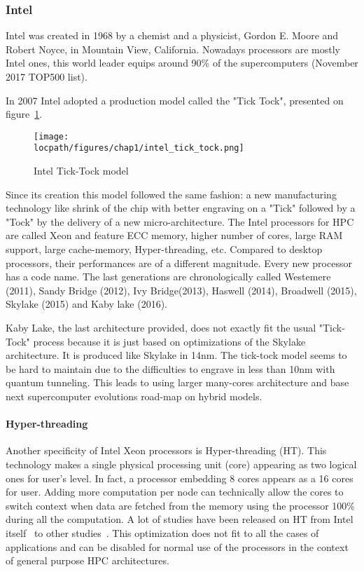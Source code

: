 \subsubsection{Intel}
Intel was created in 1968 by a chemist and a physicist, Gordon E. Moore and Robert Noyce, in Mountain View, California. 
Nowadays processors are mostly Intel ones, this world leader equips around 90\% of the supercomputers (November 2017 TOP500 list).

In 2007 Intel adopted a production model called the "Tick Tock", presented on figure~\ref{fig:1_HPC:intel_tick_tock}.
\begin{figure}[t!]
\begin{center}
\texttt{[image: \\locpath/figures/chap1/intel\_tick\_tock.png]}
\caption{Intel Tick-Tock model}
\label{fig:1_HPC:intel_tick_tock}
\end{center}
\end{figure}
Since its creation this model followed the same fashion: a new manufacturing technology like shrink of the chip with better engraving on a "Tick" followed by a "Tock" by the delivery of a new micro-architecture.
The Intel processors for HPC are called Xeon and feature ECC memory, higher number of cores, large RAM support, large cache-memory, Hyper-threading, etc. 
Compared to desktop processors, their performances are of a different magnitude.
Every new processor has a code name. 
The last generations are chronologically called Westemere (2011), Sandy Bridge (2012), Ivy Bridge(2013), Haswell (2014), Broadwell (2015), Skylake (2015) and Kaby lake (2016). 

Kaby Lake, the last architecture provided, does not exactly fit the usual "Tick-Tock" process because it is just based on optimizations of the Skylake architecture. 
It is produced like Skylake in 14nm.
The tick-tock model seems to be hard to maintain due to the difficulties to engrave in less than 10nm with quantum tunneling. 
This leads to using larger many-cores architecture and base next supercomputer evolutions road-map on hybrid models. 

\paragraph{Hyper-threading}
Another specificity of Intel Xeon processors is Hyper-threading (HT). 
This technology makes a single physical processing unit (core) appearing as two logical ones for user's level.
In fact, a processor embedding 8 cores appears as a 16 cores for user. 
Adding more computation per node can technically allow the cores to switch context when data are fetched from the memory using the processor 100\% during all the computation. 
A lot of studies have been released on HT from Intel itself~\cite{marr2002hyperthreading} to other studies~\cite{bononi2006exploring,leng2002empirical}.
This optimization does not fit to all the cases of applications and can be disabled for normal use of the processors in the context of general purpose HPC architectures.

